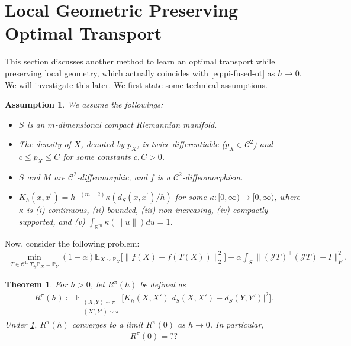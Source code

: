 \documentclass{article}
\newtheorem{theorem}{Theorem}
\newtheorem{assumption}{Assumption}
\begin{document}
\section{Local Geometric Preserving Optimal Transport}

This section discusses another method to learn an optimal transport while preserving local geometry, which actually coincides with \eqref{eq:pi-fused-ot} as $h \to 0$. We will investigate this later. We first state some technical assumptions.
\begin{assumption}
	\label{ass:kernel-analysis}
	We assume the followings:
	\begin{itemize}
		\item[(A1)] $S$ is an $m$-dimensional compact Riemannian manifold.
		\item[(A2)] The density of $X$, denoted by $p_X$, is twice-differentiable ($p_X \in \mathcal{C}^2$) and $c \leq p_X \leq C$ for some constants $c,C > 0$.
		\item[(A3)] $S$ and $M$ are $\mathcal{C}^2$-diffeomorphic, and $f$ is a $\mathcal{C}^2$-diffeomorphism.
		\item[(A4)] $K_h(x,x^\prime) = h^{-(m+2)}\kappa(d_S(x,x^\prime)/h)$ for some $\kappa : [0,\infty) \to [0,\infty)$, where $\kappa$ is (i) continuous, (ii) bounded, (iii) non-increasing, (iv) compactly supported, and (v) $\int_{\mathbb{R}^m} \kappa(\|u\|) du = 1$.
	\end{itemize}
\end{assumption}

Now, consider the following problem:
\begin{align}
	\label{eq:LGP-ot}
	\min_{T \in \mathcal{C}^1: T_{\#}\mathbb{P}_X = \mathbb{P}_Y} (1-\alpha)\mathbb{E}_{X \sim \mathbb{P}_X}\big[\|f(X)-f(T(X))\|_2^2\big] + \alpha\int_{S} \|(\mathcal{J}T)^\top(\mathcal{J}T) - I\|_F^2  .
\end{align}

\begin{theorem}
	For $h > 0$, let $R^\pi(h)$ be defined as
	\begin{align*}
		R^\pi(h) \coloneqq \mathbb{E}_{\substack{(X,Y)\sim\pi\\(X',Y')\sim\pi}} \Big[K_h(X,X') \big|d_S(X,X')-d_S(Y,Y')\big|^2\Big] .
	\end{align*}
	Under \cref{ass:kernel-analysis}, $R^\pi(h)$ converges to a limit $R^\pi(0)$ as $h \to 0$. In particular,
	\begin{align*}
		R^\pi(0) = ??
	\end{align*}
\end{theorem}
\end{document}
